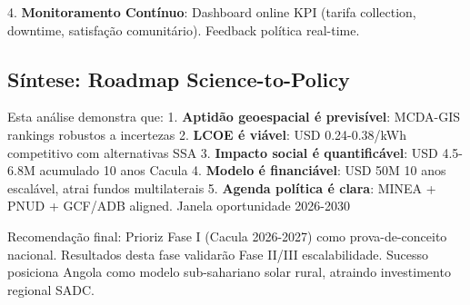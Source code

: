 \documentclass[12pt, a4paper]{article}
\begin{document}
{{{{{{{{{{{{4. \textbf{Monitoramento Contínuo}: Dashboard online KPI (tarifa collection, downtime, satisfação comunitário). Feedback política real-time.

\subsection{Síntese: Roadmap Science-to-Policy}

Esta análise demonstra que:
1. \textbf{Aptidão geoespacial é previsível}: MCDA-GIS rankings robustos a incertezas
2. \textbf{LCOE é viável}: USD 0.24-0.38/kWh competitivo com alternativas SSA
3. \textbf{Impacto social é quantificável}: USD 4.5-6.8M acumulado 10 anos Cacula
4. \textbf{Modelo é financiável}: USD 50M 10 anos escalável, atrai fundos multilaterais
5. \textbf{Agenda política é clara}: MINEA + PNUD + GCF/ADB aligned. Janela oportunidade 2026-2030

Recomendação final: Prioriz Fase I (Cacula 2026-2027) como prova-de-conceito nacional. Resultados desta fase validarão Fase II/III escalabilidade. Sucesso posiciona Angola como modelo sub-sahariano solar rural, atraindo investimento regional SADC.



\begin{abstract}
\textbf{Background:} Rural Angola exhibits one of Southern Africa's lowest electrification rates (~10\%), creating barriers to health, education, and livelihood services. Site selection for community solar systems often relies on ad-hoc criteria rather than geospatial evidence.

\textbf{Objective:} We present GEESP-Angola – a geospatial multicriteria decision analysis (MCDA) framework for identifying priority sites and appropriate technologies for community solar systems. We integrate six technical and socioeconomic layers (solar irradiance GHI, slope, VIIRS population density, grid distance, NDVI, nighttime lights) through Weighted Overlay, using weights derived via Analytic Hierarchy Process (AHP) with Saaty consistency validation (consistency ratio <0.1).

\textbf{Methods:} We apply the framework to Huíla Province, Angola, mapping 45 communities and identifying 3 priority zones (Cacula, Humpata, Quilengues). Each zone receives technology recommendations (hybrid mini-grid, off-grid kits, or solar tracker) based on LCOE and load profile.

\textbf{Results:} Top-ranked zone (Cacula) achieves normalized aptitude index 0.83 (scale 0–1); full-system LCOE (including batteries and last-mile distribution) is estimated at USD 0.24–0.35/kWh, benefiting ~95,000 people. Robust to ±20\% weight variation (3 zones maintain rankings across sensitivity scenarios). Field validation protocols developed (3-phase, 6-month design, ~200 measurements including irradiance, consumption, and access indicators). Investment requirement: USD 50M across implementation phases.


\end{abstract}}}}}}}}}}}}}
\end{document}
